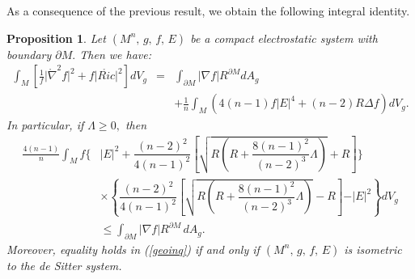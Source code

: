 \documentclass{amsart}
\newtheorem{proposition}{Proposition}
\numberwithin{equation}{section}
\begin{document}
	
As a consequence of the previous result, we obtain the following integral identity.	

	
	\begin{proposition}
	\label{propprop}
		Let $(M^{n},\,g,\,f,\,E)$ be a compact electrostatic system with boundary $\partial M.$  Then we have:
		\begin{eqnarray}\label{divformula}
			\int_{M}\left[\frac{1}{f}\vert\mathring{\nabla}^2f\vert^{2} + f\vert\mathring{Ric}\vert^{2}\right]dV_{g}	&=&	\int_{\partial M}\vert\nabla f\vert R^{\partial M} dA_{g} \nonumber\\
			&&+ \frac{1}{n}\int_{M}\left( 4(n-1)f\vert E\vert^{4}+(n-2)R\Delta f\right) dV_{g}.
		\end{eqnarray}
		In particular, if $\Lambda\geq 0,$ then
		\begin{equation}\label{geoinq}
\begin{aligned}
\frac{4(n-1)}{n}\int_{M}f\Bigg\{ &\vert E\vert^{2} +  \dfrac{(n-2)^2}{4(n - 1)^2}
\left[\sqrt{R\left(R + \dfrac{8(n-1)^2}{(n-2)^3}\Lambda\right)} + R\right]\Bigg\} \\
&\times\left\{\dfrac{(n-2)^2}{4(n - 1)^2}
\left[\sqrt{R\left(R + \dfrac{8(n-1)^2}{(n-2)^3}\Lambda\right)} - R\right] 
- \vert E\vert^{2} \right\} dV_{g} \\
&\leq \int_{\partial M}\vert\nabla f\vert R^{\partial M} \, dA_{g}.
\end{aligned}
\end{equation}
Moreover, equality holds in (\ref{geoinq}) if and only if $(M^{n},\,g,\,f,\,E)$ is isometric to the de Sitter system.
	\end{proposition}
	
	
\end{document}
